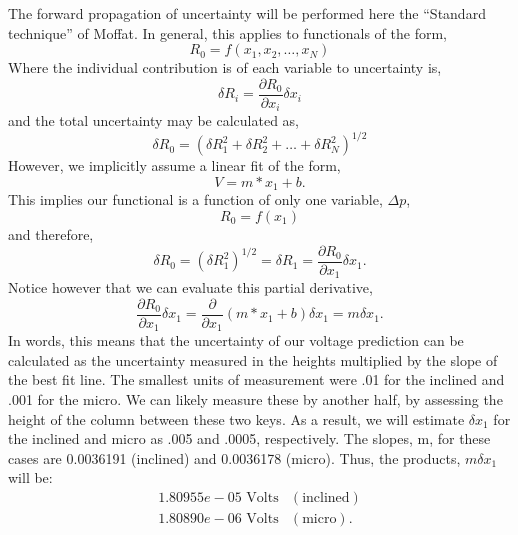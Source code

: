 \documentclass{article}
\begin{document}
The forward propagation of uncertainty will be performed here the
``Standard technique'' of Moffat. In general, this applies to
functionals of the form, 
\begin{equation}
  R_0 = f(x_1,x_2, \ldots ,x_N)
\end{equation}
Where the individual contribution is of each variable to uncertainty is,
\begin{equation}
  \delta R_i = \frac{\partial R_0}{\partial x_i} \delta x_i
\end{equation}
and the total uncertainty may be calculated as, 
\begin{equation}
  \delta R_0 = \left(\delta R_1^2 + \delta R_2^2 + \ldots + \delta R_N^2 \right)^{1/2}
\end{equation}
However, we implicitly assume a linear fit of the form, 
\begin{equation}
  V = m*x_1 + b. 
\end{equation}
This implies our functional is a function of only one variable, $\Delta p$, 
\begin{equation}
  R_0 = f(x_1)
\end{equation}
and therefore,
\begin{equation}
  \delta R_0 = \left(\delta R_1^2 \right)^{1/2} = \delta R_1 =
   \frac{\partial R_0}{\partial x_1} \delta x_1.
\end{equation}
 Notice however that we can evaluate this partial derivative, 
\begin{equation}
 \frac{\partial R_0}{\partial x_1} \delta x_1 = \frac{\partial}{\partial
  x_1}\left( m*x_1 +b \right) \delta x_1 = m \delta x_1. 
\end{equation}
In words, this means that the uncertainty of our voltage prediction can
be calculated as the uncertainty measured in the heights multiplied by
the slope of the best fit line. The smallest units of measurement were
.01 for the inclined and .001 for the micro. We can likely measure these
by another half, by assessing the height of the column between these two
keys. As a result, we will estimate $\delta x_1$ for the inclined and
micro as .005 and .0005, respectively. The slopes, m, for these cases
are 0.0036191 (inclined) and 0.0036178 (micro). Thus, the products, $m
\delta x_1$ will be: 
\begin{eqnarray}
1.80955e-05 \text{ Volts} & (\text{inclined}) \\
1.80890e-06 \text{ Volts} & (\text{micro}). 
\end{eqnarray}
\end{document}
